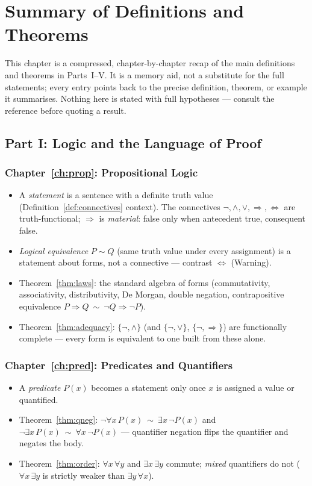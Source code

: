 \chapter{Summary of Definitions and Theorems}\label{ch:summary}

This chapter is a compressed, chapter-by-chapter recap of the main definitions and theorems in Parts~I--V. It is a memory aid, not a substitute for the full statements; every entry points back to the precise definition, theorem, or example it summarises. Nothing here is stated with full hypotheses --- consult the reference before quoting a result.

\section*{Part I: Logic and the Language of Proof}

\subsection*{Chapter~\ref{ch:prop}: Propositional Logic}
\begin{itemize}
	\item A \emph{statement} is a sentence with a definite truth value (Definition~\ref{def:connectives} context). The connectives $\neg,\wedge,\vee,\Rightarrow,\Leftrightarrow$ are truth-functional; $\Rightarrow$ is \emph{material}: false only when antecedent true, consequent false.
	\item \emph{Logical equivalence} $P\sim Q$ (same truth value under every assignment) is a statement about forms, not a connective --- contrast $\Leftrightarrow$ (Warning).
	\item Theorem~\ref{thm:laws}: the standard algebra of forms (commutativity, associativity, distributivity, De Morgan, double negation, contrapositive equivalence $P\Rightarrow Q\ \sim\ \neg Q\Rightarrow\neg P$).
	\item Theorem~\ref{thm:adequacy}: $\{\neg,\wedge\}$ (and $\{\neg,\vee\}$, $\{\neg,\Rightarrow\}$) are functionally complete --- every form is equivalent to one built from these alone.
\end{itemize}

\subsection*{Chapter~\ref{ch:pred}: Predicates and Quantifiers}
\begin{itemize}
	\item A \emph{predicate} $P(x)$ becomes a statement only once $x$ is assigned a value or quantified.
	\item Theorem~\ref{thm:qneg}: $\neg\forall x\,P(x)\ \sim\ \exists x\,\neg P(x)$ and $\neg\exists x\,P(x)\ \sim\ \forall x\,\neg P(x)$ --- quantifier negation flips the quantifier and negates the body.
	\item Theorem~\ref{thm:order}: $\forall x\,\forall y$ and $\exists x\,\exists y$ commute; \emph{mixed} quantifiers do not ($\forall x\,\exists y$ is strictly weaker than $\exists y\,\forall x$).
\end{itemize}

